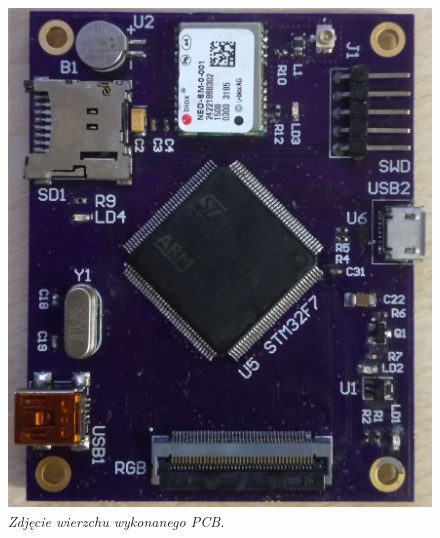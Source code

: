 \documentclass[eng,printmode]{mgr}
\begin{document}
\begin{center}\centering
\begin{figure}[!h]
\vskip 1cm
    \centering
    \includegraphics[width=\textwidth]{images/topPcb.jpg}
    \caption{\textit{Zdjęcie wierzchu wykonanego PCB.}}
\end{figure}
\end{center}
\end{document}
